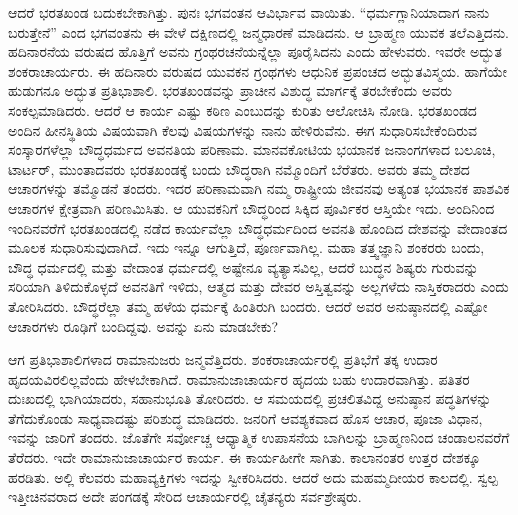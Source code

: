 ಆದರೆ ಭರತಖಂಡ ಬದುಕಬೇಕಾಗಿತ್ತು. ಪುನಃ ಭಗವಂತನ ಆವಿರ್ಭಾವ ವಾಯಿತು. “ಧರ್ಮಗ್ಲಾನಿಯಾದಾಗ ನಾನು ಬರುತ್ತೇನೆ” ಎಂದ ಭಗವಂತನು ಈ ವೇಳೆ ದಕ್ಷಿಣದಲ್ಲಿ ಜನ್ಮಧಾರಣೆ ಮಾಡಿದನು. ಆ ಬ್ರಾಹ್ಮಣ ಯುವಕ ತಲೆ\break ಎತ್ತಿದನು. ಹದಿನಾರನೆಯ ವರುಷದ ಹೊತ್ತಿಗೆ ಅವನು ಗ್ರಂಥರಚನೆಯನ್ನೆಲ್ಲಾ ಪೂರೈಸಿದನು ಎಂದು ಹೇಳುವರು. ಇವರೇ ಅದ್ಭುತ ಶಂಕರಾಚಾರ್ಯರು. ಈ ಹದಿನಾರು ವರುಷದ ಯುವಕನ ಗ್ರಂಥಗಳು ಆಧುನಿಕ ಪ್ರಪಂಚದ ಅದ್ಭುತವಿಸ್ಮಯ. ಹಾಗೆಯೇ ಹುಡುಗನೂ ಅದ್ಭುತ ಪ್ರತಿಭಾಶಾಲಿ. ಭರತಖಂಡವನ್ನು ಪ್ರಾಚೀನ ವಿಶುದ್ಧ ಮಾರ್ಗಕ್ಕೆ ತರಬೇಕೆಂದು ಅವರು ಸಂಕಲ್ಪಮಾಡಿದರು. ಆದರೆ ಆ ಕಾರ್ಯ ಎಷ್ಟು ಕಠಿಣ ಎಂಬುದನ್ನು ಕುರಿತು ಆಲೋಚಿಸಿ ನೋಡಿ. ಭರತಖಂಡದ ಅಂದಿನ ಹೀನಸ್ಥಿತಿಯ ವಿಷಯವಾಗಿ ಕೆಲವು ವಿಷಯಗಳನ್ನು ನಾನು ಹೇಳಿರುವೆನು. ಈಗ ಸುಧಾರಿಸಬೇಕೆಂದಿರುವ ಸಂಸ್ಕಾರಗಳೆಲ್ಲಾ ಬೌದ್ಧಧರ್ಮದ ಅವನತಿಯ ಪರಿಣಾಮ. ಮಾನವಕೋಟಿಯ ಭಯಾನಕ ಜನಾಂಗಗಳಾದ ಬಲೂಚಿ, ಟಾರ್ಟರ್​, ಮುಂತಾದವರು ಭರತಖಂಡಕ್ಕೆ ಬಂದು ಬೌದ್ಧರಾಗಿ ನಮ್ಮೊಂದಿಗೆ ಬೆರೆತರು. ಅವರು ತಮ್ಮ ದೇಶದ ಆಚಾರಗಳನ್ನು ತಮ್ಮೊಡನೆ ತಂದರು. ಇದರ ಪರಿಣಾಮವಾಗಿ ನಮ್ಮ ರಾಷ್ಟ್ರೀಯ ಜೀವನವು ಅತ್ಯಂತ ಭಯಾನಕ ಪಾಶವಿಕ ಆಚಾರಗಳ ಕ್ಷೇತ್ರವಾಗಿ ಪರಿಣಮಿಸಿತು. ಆ ಯುವಕನಿಗೆ ಬೌದ್ಧರಿಂದ ಸಿಕ್ಕಿದ ಪೂರ್ವಿಕರ ಆಸ್ತಿಯೇ ಇದು. ಅಂದಿನಿಂದ ಇಂದಿನವರೆಗೆ ಭರತಖಂಡದಲ್ಲಿ ನಡೆದ ಕಾರ್ಯವೆಲ್ಲಾ ಬೌದ್ಧಧರ್ಮದಿಂದ ಅವನತಿ ಹೊಂದಿದ ದೇಶವನ್ನು ವೇದಾಂತದ ಮೂಲಕ ಸುಧಾರಿಸುವುದಾಗಿದೆ. ಇದು ಇನ್ನೂ ಆಗುತ್ತಿದೆ, ಪೂರ್ಣವಾಗಿಲ್ಲ. ಮಹಾ ತತ್ತ್ವಜ್ಞಾನಿ ಶಂಕರರು ಬಂದು, ಬೌದ್ಧ ಧರ್ಮದಲ್ಲಿ ಮತ್ತು ವೇದಾಂತ ಧರ್ಮದಲ್ಲಿ ಅಷ್ಟೇನೂ ವ್ಯತ್ಯಾಸವಿಲ್ಲ, ಆದರೆ ಬುದ್ಧನ ಶಿಷ್ಯರು ಗುರುವನ್ನು ಸರಿಯಾಗಿ ತಿಳಿದುಕೊಳ್ಳದೆ ಅವನತಿಗೆ ಇಳಿದು, ಆತ್ಮದ ಮತ್ತು ದೇವರ ಅಸ್ತಿತ್ವವನ್ನು ಅಲ್ಲಗಳೆದು ನಾಸ್ತಿಕರಾದರು ಎಂದು ತೋರಿಸಿದರು. ಬೌದ್ಧರೆಲ್ಲಾ ತಮ್ಮ ಹಳೆಯ ಧರ್ಮಕ್ಕೆ ಹಿಂತಿರುಗಿ ಬಂದರು. ಆದರೆ ಅವರ ಅನುಷ್ಠಾನದಲ್ಲಿ ಎಷ್ಟೋ ಆಚಾರಗಳು ರೂಢಿಗೆ ಬಂದಿದ್ದವು. ಅವನ್ನು ಏನು ಮಾಡಬೇಕು? 

ಆಗ ಪ್ರತಿಭಾಶಾಲಿಗಳಾದ ರಾಮಾನುಜರು ಜನ್ಮವೆತ್ತಿದರು. ಶಂಕರಾಚಾರ್ಯರಲ್ಲಿ ಪ್ರತಿಭೆಗೆ ತಕ್ಕ ಉದಾರ ಹೃದಯವಿರಲಿಲ್ಲವೆಂದು ಹೇಳಬೇಕಾಗಿದೆ. ರಾಮಾನುಜಾಚಾರ್ಯರ ಹೃದಯ ಬಹು ಉದಾರವಾಗಿತ್ತು. ಪತಿತರ ದುಃಖದಲ್ಲಿ ಭಾಗಿಯಾದರು, ಸಹಾನುಭೂತಿ ತೋರಿದರು. ಆ ಸಮಯದಲ್ಲಿ ಪ್ರಚಲಿತವಿದ್ದ ಅನುಷ್ಠಾನ ಪದ್ಧತಿಗಳನ್ನು ತೆಗೆದುಕೊಂಡು ಸಾಧ್ಯವಾದಷ್ಟು ಪರಿಶುದ್ಧ ಮಾಡಿದರು. ಜನರಿಗೆ ಆವಶ್ಯಕವಾದ ಹೊಸ ಆಚಾರ, ಪೂಜಾ ವಿಧಾನ, ಇವನ್ನು ಜಾರಿಗೆ ತಂದರು. ಜೊತೆಗೇ ಸರ್ವೋಚ್ಚ ಆಧ್ಯಾತ್ಮಿಕ ಉಪಾಸನೆಯ ಬಾಗಿಲನ್ನು ಬ್ರಾಹ್ಮಣನಿಂದ ಚಂಡಾಲನವರೆಗೆ ತೆರೆದರು. ಇದೇ ರಾಮಾನುಜಾಚಾರ್ಯರ ಕಾರ್ಯ. ಈ ಕಾರ್ಯಹೀಗೇ ಸಾಗಿತು. ಕಾಲಾನಂತರ ಉತ್ತರ ದೇಶಕ್ಕೂ ಹರಡಿತು. ಅಲ್ಲಿ ಕೆಲವರು ಮಹಾವ್ಯಕ್ತಿಗಳು ಇದನ್ನು ಸ್ವೀಕರಿಸಿದರು. ಆದರೆ ಅದು ಮಹಮ್ಮದೀಯರ ಕಾಲದಲ್ಲಿ. ಸ್ವಲ್ಪ ಇತ್ತೀಚಿನವರಾದ ಅದೇ ಪಂಗಡಕ್ಕೆ ಸೇರಿದ ಆಚಾರ್ಯರಲ್ಲಿ ಚೈತನ್ಯರು ಸರ್ವಶ್ರೇಷ್ಠರು. 

